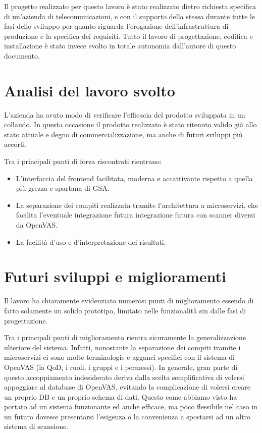 Il progetto realizzato per questo lavoro è stato realizzato dietro richiesta specifica di un'azienda di telecomunicazioni, e con il supporto della stessa durante tutte le fasi dello sviluppo per quanto riguarda l'erogazione dell'infrastruttura di produzione e la specifica dei requisiti. Tutto il lavoro di progettazione, codifica e installazione è stato invece svolto in totale autonomia dall'autore di questo documento.

\section{Analisi del lavoro svolto}
L'azienda ha avuto modo di verificare l'efficacia del prodotto sviluppata in un collaudo. In questa occasione il prodotto realizzato è stato ritenuto valido già allo stato attuale e degno di commercializzazione, ma anche di futuri sviluppi più accorti.

Tra i principali punti di forza riscontrati rientrano:
\begin{itemize}
    \item L'interfaccia del frontend facilitata, moderna e accattivante rispetto a quella più grezza e spartana di GSA.
    \item La separazione dei compiti realizzata tramite l'architettura a microservizi, che facilita l'eventuale integrazione futura integrazione futura con scanner diversi da OpenVAS.
    \item La facilità d'uso e d'interpretazione dei risultati.
\end{itemize}

\section{Futuri sviluppi e miglioramenti}
Il lavoro ha chiaramente evidenziato numerosi punti di miglioramento essendo di fatto solamente un solido prototipo, limitato nelle funzionalità sin dalle fasi di progettazione.

Tra i principali punti di miglioramento rientra sicuramente la generalizzazione ulteriore del sistema. Infatti, nonostante la separazione dei compiti tramite i microservizi ci sono molte terminologie e agganci specifici con il sistema di OpenVAS (la QoD, i ruoli, i gruppi e i permessi). In generale, gran parte di questo accoppiamento indesiderato deriva dalla scelta semplificativa di volersi appoggiare al database di OpenVAS, evitando la complicazione di volersi creare un proprio DB e un proprio schema di dati. Questo come abbiamo visto ha portato ad un sistema funzionante ed anche efficace, ma poco flessibile nel caso in un futuro dovesse presentarsi l'esigenza o la convenienza a spostarsi ad un altro sistema di scansione.

